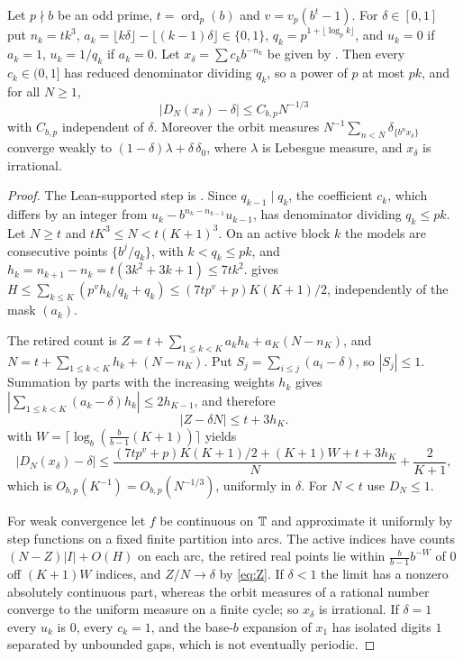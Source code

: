 \documentclass[11pt]{article}
\newcommand{\fr}[1]{\{#1\}}
\DeclareMathOperator{\ord}{ord}
\begin{document}
\begin{theorem}\label{thm:program}
Let $p\nmid b$ be an odd prime, $t=\ord_p(b)$ and $v=v_p(b^t-1)$. For $\delta\in[0,1]$ put $n_k=tk^3$,
$a_k=\lfloor k\delta\rfloor-\lfloor(k-1)\delta\rfloor\in\{0,1\}$, $q_k=p^{1+\lfloor\log_pk\rfloor}$, and
$u_k=0$ if $a_k=1$, $u_k=1/q_k$ if $a_k=0$. Let $x_\delta=\sum c_kb^{-n_k}$ be given by
. Then every $c_k\in(0,1]$ has reduced denominator dividing $q_k$, so a power of $p$
at most $pk$, and for all $N\ge1$,
\[
|D_N(x_\delta)-\delta|\le C_{b,p}N^{-1/3}
\]
with $C_{b,p}$ independent of $\delta$. Moreover the orbit measures
$N^{-1}\sum_{n<N}\delta_{\fr{b^nx_\delta}}$ converge weakly to $(1-\delta)\lambda+\delta\,\delta_0$, where
$\lambda$ is Lebesgue measure, and $x_\delta$ is irrational.
\end{theorem}

\begin{proof}
The Lean-supported step is . Since $q_{k-1}\mid q_k$, the coefficient $c_k$, which
differs by an integer from $u_k-b^{n_k-n_{k-1}}u_{k-1}$, has denominator dividing $q_k\le pk$. Let
$N\ge t$ and $tK^3\le N<t(K+1)^3$. On an active
block $k$ the models are consecutive points $\fr{b^j/q_k}$, with $k<q_k\le pk$, and
$h_k=n_{k+1}-n_k=t(3k^2+3k+1)\le7tk^2$.  gives
$H\le\sum_{k\le K}(p^vh_k/q_k+q_k)\le(7tp^v+p)K(K+1)/2$, independently of the mask $(a_k)$.

The retired count is $Z=t+\sum_{1\le k<K}a_kh_k+a_K(N-n_K)$, and $N=t+\sum_{1\le k<K}h_k+(N-n_K)$. Put
$S_j=\sum_{i\le j}(a_i-\delta)$, so $|S_j|\le1$. Summation by parts with the increasing weights $h_k$
gives $|\sum_{1\le k<K}(a_k-\delta)h_k|\le2h_{K-1}$, and therefore
\begin{equation}\label{eq:Z}
|Z-\delta N|\le t+3h_K .
\end{equation}
 with $W=\lceil\log_b(\frac b{b-1}(K+1))\rceil$ yields
\[
|D_N(x_\delta)-\delta|\le\frac{(7tp^v+p)K(K+1)/2+(K+1)W+t+3h_K}{N}+\frac2{K+1},
\]
which is $O_{b,p}(K^{-1})=O_{b,p}(N^{-1/3})$, uniformly in $\delta$. For $N<t$ use $D_N\le1$.

For weak convergence let $f$ be continuous on $\mathbb T$ and approximate it uniformly by step functions
on a fixed finite partition into arcs. The active indices have counts $(N-Z)|I|+O(H)$ on each arc,
the retired real points lie within $\frac b{b-1}b^{-W}$ of $0$ off $(K+1)W$ indices, and
$Z/N\to\delta$ by \eqref{eq:Z}. If $\delta<1$ the limit has a nonzero absolutely continuous part,
whereas the orbit measures of a rational number converge to the uniform measure on a finite cycle;
so $x_\delta$ is irrational. If $\delta=1$ every $u_k$ is $0$, every $c_k=1$, and the base-$b$ expansion
of $x_1$ has isolated digits $1$ separated by unbounded gaps, which is not eventually periodic.
\end{proof}
\end{document}
